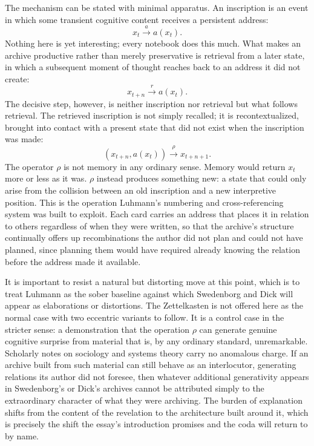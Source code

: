\documentclass[11pt]{article}
\begin{document}
The mechanism can be stated with minimal apparatus. An inscription is an event in which some transient cognitive content receives a persistent address:
\[
x_t \xrightarrow{a} a(x_t).
\]
Nothing here is yet interesting; every notebook does this much. What makes an archive productive rather than merely preservative is retrieval from a later state, in which a subsequent moment of thought reaches back to an address it did not create:
\[
x_{t+n} \xrightarrow{r} a(x_t).
\]
The decisive step, however, is neither inscription nor retrieval but what follows retrieval. The retrieved inscription is not simply recalled; it is recontextualized, brought into contact with a present state that did not exist when the inscription was made:
\[
(x_{t+n}, a(x_t)) \xrightarrow{\rho} x_{t+n+1}.
\]
The operator $\rho$ is not memory in any ordinary sense. Memory would return $x_t$ more or less as it was. $\rho$ instead produces something new: a state that could only arise from the collision between an old inscription and a new interpretive position. This is the operation Luhmann's numbering and cross-referencing system was built to exploit. Each card carries an address that places it in relation to others regardless of when they were written, so that the archive's structure continually offers up recombinations the author did not plan and could not have planned, since planning them would have required already knowing the relation before the address made it available.

It is important to resist a natural but distorting move at this point, which is to treat Luhmann as the sober baseline against which Swedenborg and Dick will appear as elaborations or distortions. The Zettelkasten is not offered here as the normal case with two eccentric variants to follow. It is a control case in the stricter sense: a demonstration that the operation $\rho$ can generate genuine cognitive surprise from material that is, by any ordinary standard, unremarkable. Scholarly notes on sociology and systems theory carry no anomalous charge. If an archive built from such material can still behave as an interlocutor, generating relations its author did not foresee, then whatever additional generativity appears in Swedenborg's or Dick's archives cannot be attributed simply to the extraordinary character of what they were archiving. The burden of explanation shifts from the content of the revelation to the architecture built around it, which is precisely the shift the essay's introduction promises and the coda will return to by name.
\end{document}

